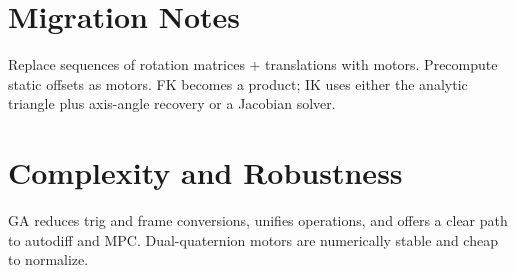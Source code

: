 \documentclass[11pt]{article}
\begin{document}
\section{Migration Notes}
Replace sequences of rotation matrices + translations with motors.
Precompute static offsets as motors. FK becomes a product; IK uses either the analytic triangle plus axis-angle recovery or a Jacobian solver.

\section{Complexity and Robustness}
GA reduces trig and frame conversions, unifies operations, and offers a clear path to autodiff and MPC. Dual-quaternion motors are numerically stable and cheap to normalize.



\end{document}
